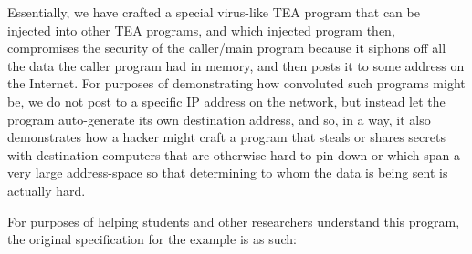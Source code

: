 \documentclass[a4paper, 18pt]{book} %
\begin{document}
Essentially, we have crafted a special virus-like TEA program that can be injected into other TEA programs, and which injected program then, compromises the security of the caller/main program because it siphons off all the data the caller program had in memory, and then posts it to some address on the Internet. For purposes of demonstrating how convoluted such programs might be, we do not post to a specific IP address on the network, but instead let the program auto-generate its own destination address, and so, in a way, it also demonstrates how a hacker might craft a program that steals or shares secrets with destination computers that are otherwise hard to pin-down or which span a very large address-space so that determining to whom the data is being sent is actually hard.

\vspace{1em}

For purposes of helping students and other researchers understand this program, the original specification for the example is as such:
\end{document}

